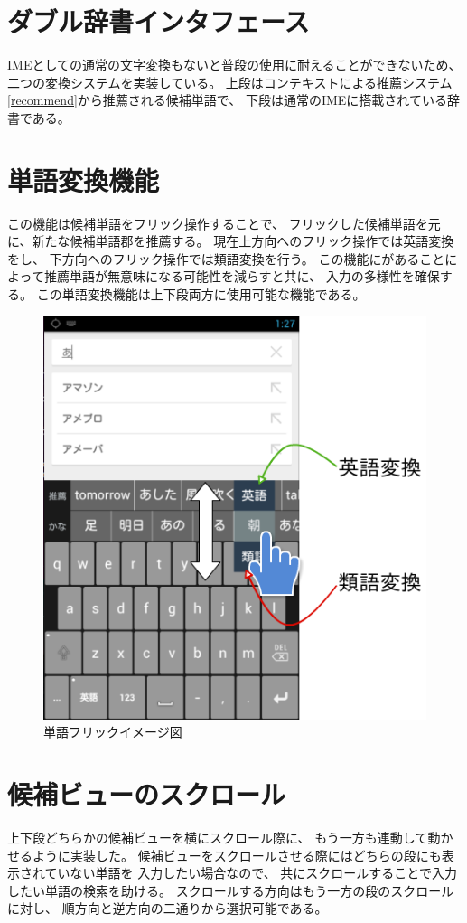 \section{ダブル辞書インタフェース}
IMEとしての通常の文字変換もないと普段の使用に耐えることができないため、
二つの変換システムを実装している。
上段はコンテキストによる推薦システム\ref{recommend}から推薦される候補単語で、
下段は通常のIMEに搭載されている辞書である。


\section{単語変換機能}
この機能は候補単語をフリック操作することで、
フリックした候補単語を元に、新たな候補単語郡を推薦する。
現在上方向へのフリック操作では英語変換をし、
下方向へのフリック操作では類語変換を行う。
この機能にがあることによって推薦単語が無意味になる可能性を減らすと共に、
入力の多様性を確保する。
この単語変換機能は上下段両方に使用可能な機能である。

\begin{figure}
  \begin{center}
    \includegraphics[width=14cm,bb=0 0 461 485]{images/candidateflick.png}
  \end{center}
  \caption{単語フリックイメージ図}
  \label{fig:wordflick}
\end{figure}

\section{候補ビューのスクロール}
上下段どちらかの候補ビューを横にスクロール際に、
もう一方も連動して動かせるように実装した。
候補ビューをスクロールさせる際にはどちらの段にも表示されていない単語を
入力したい場合なので、
共にスクロールすることで入力したい単語の検索を助ける。
スクロールする方向はもう一方の段のスクロールに対し、
順方向と逆方向の二通りから選択可能である。

